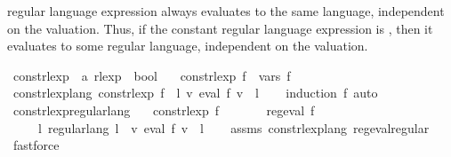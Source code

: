 \begin{isabellebody}
\begin{isamarkuptext}
regular language expression always evaluates to the same language, independent on the valuation.
Thus, if the constant regular language expression is , then it evaluates to some
regular language, independent on the valuation.%
\end{isamarkuptext}\isamarkuptrue%
\isamarkupfalse%
\ const{\isacharunderscore}{\kern0pt}rlexp\ {\isacharcolon}{\kern0pt}{\isacharcolon}{\kern0pt}\ {\isachardoublequoteopen}{\isacharprime}{\kern0pt}a\ rlexp\ {\isasymRightarrow}\ bool{\isachardoublequoteclose}\ \isanewline
\ \ {\isachardoublequoteopen}const{\isacharunderscore}{\kern0pt}rlexp\ f\ {\isasymequiv}\ vars\ f\ {\isacharequal}{\kern0pt}\ {\isacharbraceleft}{\kern0pt}{\isacharbraceright}{\kern0pt}{\isachardoublequoteclose}\isanewline
\isanewline
{}\isamarkupfalse%
\ const{\isacharunderscore}{\kern0pt}rlexp{\isacharunderscore}{\kern0pt}lang{\isacharcolon}{\kern0pt}\ {\isachardoublequoteopen}const{\isacharunderscore}{\kern0pt}rlexp\ f\ {\isasymLongrightarrow}\ {\isasymexists}l{\isachardot}{\kern0pt}\ {\isasymforall}v{\isachardot}{\kern0pt}\ eval\ f\ v\ {\isacharequal}{\kern0pt}\ l{\isachardoublequoteclose}\isanewline
%
\isadelimproof
\ \ %
\endisadelimproof
%
\isatagproof
{}\isamarkupfalse%
\ {\isacharparenleft}{\kern0pt}induction\ f{\isacharparenright}{\kern0pt}\ auto%
\endisatagproof
{\isafoldproof}%
%
\isadelimproof
\isanewline
%
\endisadelimproof
\isanewline
{}\isamarkupfalse%
\ const{\isacharunderscore}{\kern0pt}rlexp{\isacharunderscore}{\kern0pt}regular{\isacharunderscore}{\kern0pt}lang{\isacharcolon}{\kern0pt}\isanewline
\ \ \ {\isachardoublequoteopen}const{\isacharunderscore}{\kern0pt}rlexp\ f{\isachardoublequoteclose}\isanewline
\ \ \ \ \ \ \ {\isachardoublequoteopen}reg{\isacharunderscore}{\kern0pt}eval\ f{\isachardoublequoteclose}\isanewline
\ \ \ \ \ {\isachardoublequoteopen}{\isasymexists}l{\isachardot}{\kern0pt}\ regular{\isacharunderscore}{\kern0pt}lang\ l\ {\isasymand}\ {\isacharparenleft}{\kern0pt}{\isasymforall}v{\isachardot}{\kern0pt}\ eval\ f\ v\ {\isacharequal}{\kern0pt}\ l{\isacharparenright}{\kern0pt}{\isachardoublequoteclose}\isanewline
%
\isadelimproof
\ \ %
\endisadelimproof
%
\isatagproof
{}\isamarkupfalse%
\ assms\ const{\isacharunderscore}{\kern0pt}rlexp{\isacharunderscore}{\kern0pt}lang\ reg{\isacharunderscore}{\kern0pt}eval{\isacharunderscore}{\kern0pt}regular\ \isamarkupfalse%
\ fastforce%
\endisatagproof
{\isafoldproof}%
%
\isadelimproof
\isanewline
%
\endisadelimproof
%
\isadelimtheory
\isanewline
%
\endisadelimtheory
%
\isatagtheory
{}\isamarkupfalse%
%
\endisatagtheory
{\isafoldtheory}%
%
\isadelimtheory
%
\endisadelimtheory
%
\end{isabellebody}%
